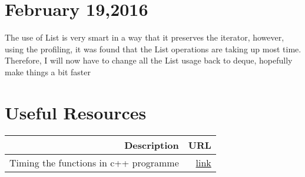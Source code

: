 \documentclass[12pt]{article}
\begin{document}
	\section{February 19,2016}
	The use of List is very smart in a way that it preserves the iterator, however, using the profiling, it was found that the List operations are taking up most time. 
	Therefore, I will now have to change all the List usage back to deque, hopefully make things a bit faster
	\newpage
	\section{Useful Resources}
	\begin{table}[H]
		\centering
		\begin{tabular}{rr}
			\toprule
			Description & URL \\
			\midrule
			Timing the functions in c++ programme & \href{http://stackoverflow.com/a/21995693}{link}\\
			\bottomrule
		\end{tabular}
	\end{table}
\end{document}
